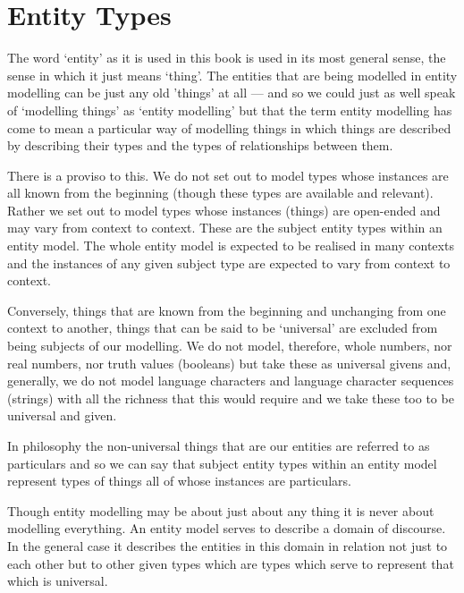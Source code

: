 
\section{Entity Types}

\mynote The word `entity' as it is used in this book is used in its most general sense,  the sense in which it just means `thing'. The entities that are being modelled in entity modelling can be just any old 'things' at all --- and so we could just as well speak of `modelling things' as `entity modelling' but that the term entity modelling
has come to mean a particular way of modelling things in which things are described by describing their types and the types of relationships between them.

\mynote There is a proviso to this. We do not set out to model types whose instances are all known from the beginning (though these types are available and relevant). Rather we set out to model types whose instances (things) are open-ended and may vary from context to context. These are the subject entity types within an entity model. The whole entity model is expected to be realised in many contexts and the instances of any given subject type are expected to vary from context to context.
 
\mynote
Conversely, things that are known from the beginning and unchanging from one context to another, things that can be said to be `universal' are excluded from being subjects of our modelling. We do not model, therefore, whole numbers, nor real numbers, nor truth values (booleans) but take these as universal givens and, generally, we do not model language characters and language character sequences (strings) with all the richness that this would require and we take these too to be universal and given. 

\mynote
In philosophy the non-universal things that are our entities are referred to as particulars and so we can say that subject entity types within an entity model represent types of things all of whose instances are particulars. 

\mynote Though entity modelling may be about just about any thing it is never about modelling everything.
An entity model serves to describe a domain of discourse. In the general case it describes the entities in this domain in relation not just to each other but to other given types which are types which serve to represent that which is universal. 

